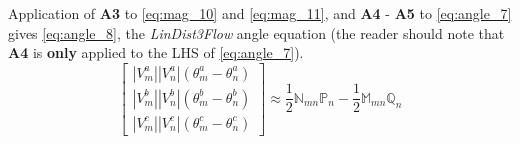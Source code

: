 \noindent Application of \textbf{A3} to \eqref{eq:mag_10} and \eqref{eq:mag_11}, and \textbf{A4} - \textbf{A5} to \eqref{eq:angle_7} gives \eqref{eq:angle_8}, the \emph{LinDist3Flow} angle equation (the reader should note that \textbf{A4} is \textbf{only} applied to the LHS of \eqref{eq:angle_7}).
\begin{equation}
	\begin{bmatrix}
    	\left| V_{m}^{a} \right| \left| V_{n}^{a} \right| \left( \theta_{m}^{a} - \theta_{n}^{a} \right) \\
        \left| V_{m}^{b} \right| \left| V_{n}^{b} \right| \left( \theta_{m}^{b} - \theta_{n}^{b} \right) \\
        \left| V_{m}^{c} \right| \left| V_{n}^{c} \right| \left( \theta_{m}^{c} - \theta_{n}^{c} \right)
    \end{bmatrix}
	\approx \frac{1}{2} \mathbb{N}_{mn} \mathbb{P}_{n} - \frac{1}{2}\mathbb{M}_{mn} \mathbb{Q}_{n}
    \label{eq:angle_8}
\end{equation}

